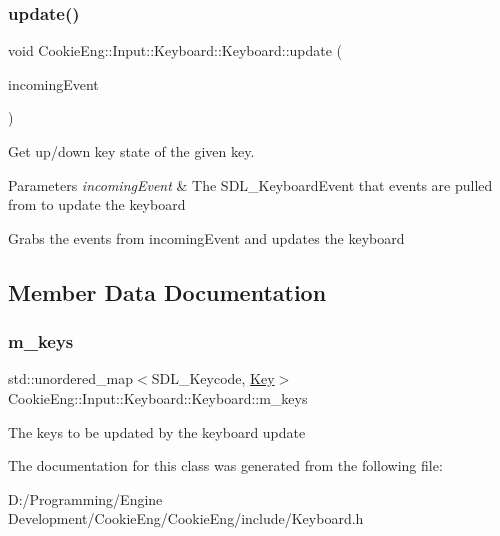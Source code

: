 \subsubsection{\texorpdfstring{update()}{update()}}
{\footnotesize\ttfamily void Cookie\+Eng\+::\+Input\+::\+Keyboard\+::\+Keyboard\+::update (\begin{DoxyParamCaption}\item[{S\+D\+L\+\_\+\+Keyboard\+Event \&}]{incoming\+Event }\end{DoxyParamCaption})}



Get up/down key state of the given key. 


\begin{DoxyParams}{Parameters}
{\em incoming\+Event} & The S\+D\+L\+\_\+\+Keyboard\+Event that events are pulled from to update the keyboard\\
\hline
\end{DoxyParams}
Grabs the events from incoming\+Event and updates the keyboard 

\subsection{Member Data Documentation}
\mbox{\label{class_cookie_eng_1_1_input_1_1_keyboard_1_1_keyboard_a6b77b43567c775186e151a6fcfeea502}} 
\subsubsection{\texorpdfstring{m\+\_\+keys}{m\_keys}}
{\footnotesize\ttfamily std\+::unordered\+\_\+map$<$S\+D\+L\+\_\+\+Keycode, \hyperlink{class_cookie_eng_1_1_input_1_1_keyboard_1_1_key}{Key}$>$ Cookie\+Eng\+::\+Input\+::\+Keyboard\+::\+Keyboard\+::m\+\_\+keys\hspace{0.3cm}{\ttfamily [protected]}}

The keys to be updated by the keyboard update 

The documentation for this class was generated from the following file\+:\begin{DoxyCompactItemize}
\item 
D\+:/\+Programming/\+Engine Development/\+Cookie\+Eng/\+Cookie\+Eng/include/Keyboard.\+h\end{DoxyCompactItemize}
